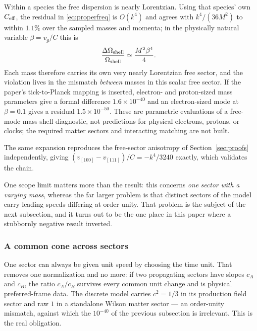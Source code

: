 \documentclass[11pt,a4paper]{article}
\theoremstyle{definition}
\theoremstyle{plain}
\theoremstyle{remark}
\begin{document}
Within a species the free dispersion is nearly Lorentzian. Using that
species' own $C_{\rm eff}$, the residual in \eqref{eq:properfreq} is $O(k^4)$ and agrees
with $k^4/(36M^2)$ to within $1.1\%$ over the sampled masses and momenta;
in the physically natural variable $\beta = v_g/C$ this is
\begin{equation}
\frac{\Delta\Omega_{\rm shell}}{\Omega_{\rm shell}}
\simeq \frac{M^2\beta^4}{4}.
\label{eq:dilerr}
\end{equation}
Each mass therefore carries its own very nearly Lorentzian free sector, and the
violation lives in the mismatch \emph{between} masses in this scalar free
sector. If the paper's tick-to-Planck mapping is inserted, electron- and
proton-sized mass parameters give a formal difference
$1.6\times10^{-40}$ and an electron-sized mode at $\beta=0.1$ gives a
residual $1.5\times10^{-50}$. These are parametric evaluations of a
free-mode mass-shell diagnostic, not predictions for physical electrons,
protons, or clocks;
the required matter sectors and interacting matching are not built.

The same expansion reproduces the free-sector anisotropy of
Section~\ref{sec:proofs} independently, giving
$(v_{[100]} - v_{[111]})/C = -k^4/3240$ exactly, which validates the
chain.

One scope limit matters more than the result: this concerns \emph{one
sector with a varying mass}, whereas the far larger problem is that
distinct sectors of the model carry leading speeds differing at order
unity. That problem is the subject of the next subsection, and it turns
out to be the one place in this paper where a stubbornly negative result
inverted.

\subsubsection{A common cone across sectors}
\label{sec:intersector}

One sector can always be given unit speed by choosing the time unit. That
removes one normalization and no more: if two propagating sectors have
slopes $c_A$ and $c_B$, the ratio $c_A/c_B$ survives every common unit
change and is physical preferred-frame data. The discrete model carries
$c^2 = 1/3$ in its production field sector and raw $1$ in a standalone
Wilson matter sector --- an order-unity mismatch, against which the
$10^{-40}$ of the previous subsection is irrelevant. This is the real
obligation.
\end{document}
